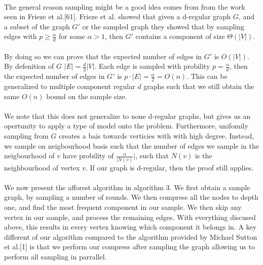 \documentclass[]{article}
\begin{document}
\paragraph{}
The general reason sampling might be a good idea comes from from the work seen in Frieze et al.[61].
Frieze et al. showed that given a d-regular graph $G$, and a subset of the graph $G'$ or the sampled graph they showed that by sampling edges with $p \ge \frac{\alpha}{d}$ for some $\alpha > 1$, then $G'$ contains a component of size $\Theta(|V|)$. 

\paragraph{}
By doing so we can prove that the expected number of edges in $G'$ is $O(|V|)$.
By defenition of $G$ $|E| = \frac{d}{2}|V|$. Each edge is sampled with probility $p=\frac{\alpha}{d}$, then the expected number of edges in $G'$ is $p\cdot |E| = \frac{\alpha}{2} = O(n)$. This can be generalized to multiple component regular $d$ graphs such that we still obtain the same $O(n)$ bound on the sample size. 

\paragraph{}
We note that this does not generalize to none d-regular graphs, but gives us an opertunity to apply a type of model onto the problem. Furthermore, unifomily sampling from $G$ creates a bais towards verticies with with high degree. Instead, we sample on neigbourhood basis such that the number of edges we sample in the neigbourhood of $v$ have probility of $\frac{\alpha}{|N(v)}|$, such that $N(v)$ is the neighbourhood of vertex $v$. If our graph is d-regular, then the proof still applies.

\paragraph{}
We now present the afforest algorithm in algorithm 3. We first obtain a sample graph, by sampling a number of rounds. We then compress all the nodes to depth one, and find the most frequent component in our sample. We then skip any vertex in our sample, and process the remaining edges. With everything discused above, this results in every vertex knowing which component it belongs in. A key different of our algorithm compared to the algorithm provided by Michael Sutton et al.[1] is that we perform our compress after sampling the graph allowing us to perform all sampling in parrallel.
\end{document}
